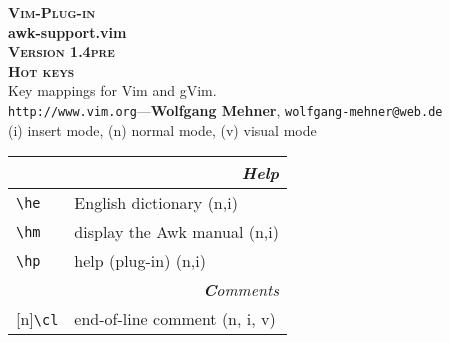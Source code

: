 \documentclass[oneside,10pt,landscape,DIV16]{scrartcl}
\newcommand{\Pluginversion}{1.4pre}
\newcommand{\Rep}{{\scriptsize{[n]}}}
\begin{document}
%

\begin{multicols}{3}
%
\begin{center}
%
\textbf{\textsc{\small{Vim-Plug-in}}}\\
\textbf{\LARGE{awk-support.vim}}\\
\textbf{\textsc{\small{Version \Pluginversion}}}\\
\vspace{1mm}%
\textbf{\textsc{\Huge{Hot keys}}}\\ 
\vspace{1mm}%
Key mappings for Vim and gVim.\\
{\tiny  \texttt{http://www.vim.org}\hspace{1.5mm}---\hspace{1.5mm}\textbf{Wolfgang Mehner},  \texttt{wolfgang-mehner@web.de}}\\
\vspace{1.0mm}
{\normalsize (i)} insert mode, {\normalsize (n)} normal mode, {\normalsize (v)} visual mode\\
\vspace{1.0mm}
%
\begin{tabular}[]{|p{11mm}|p{60mm}|}
\hline 
\multicolumn{2}{|r|}{\textsl{\textbf{H}elp}}\\[1.0ex]
\hline \verb'\he'   & English dictionary                     \hfill (n,i)\\
\hline \verb'\hm'   & display the Awk manual                 \hfill (n,i)\\
\hline \verb'\hp'   & help (plug-in)                         \hfill (n,i)\\
\hline 
\hline
\multicolumn{2}{|r|}{\textsl{\textbf{C}omments}}                       \\[1.0ex]
\hline \Rep\verb'\cl'   & end-of-line comment               \hfill (n, i, v)\\

\end{tabular}
\end{center}
\end{multicols}
\end{document}
